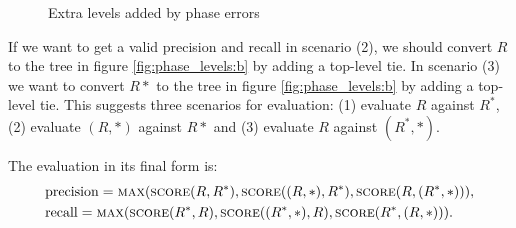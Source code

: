 \begin{figure}
\caption{Extra levels added by phase errors}
\label{fig:phase_levels}
\end{figure}

If we want to get a valid precision and recall in scenario (2), we should convert $R$ to the tree in figure \ref{fig:phase_levels:b} by adding a top-level tie. In scenario (3) we want to convert $R*$ to the tree in figure \ref{fig:phase_levels:b} by adding a top-level tie. This suggests three scenarios for evaluation: (1) evaluate $R$ against $R^*$, (2) evaluate $(R, *)$ against $R*$ and (3) evaluate $R$ against $(R^*, *)$. 

The evaluation in its final form is:
\begin{align}
\label{eq:evaluation}
&\mathrm{precision} = \textsc{max}(\textsc{score}(R, R^*), \textsc{score}((R, *), R^*), \textsc{score}(R, (R^*, *))),\\
&\mathrm{recall} = \textsc{max}(\textsc{score}(R^*, R), \textsc{score}((R^*, *), R), \textsc{score}(R^*, (R, *))).
\end{align}





